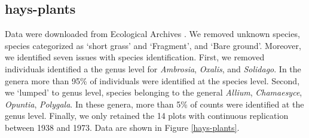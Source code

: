 \documentclass[11pt, oneside]{article}
\begin{document}
\subsection{hays-plants}
Data were downloaded from Ecological Archives \citep{hay_data}.
We removed unknown species, species categorized as `short grass' and `Fragment', and `Bare ground'. 
Moreover, we identified seven issues with species identification. 
First, we removed individuals identified a the genus level for \textit{Ambrosia}, \textit{Oxalis}, and \textit{Solidago}. 
In the genera more than 95\% of individuals were identified at the species level. 
Second, we `lumped' to genus level, species belonging to the general \textit{Allium}, \textit{Chamaesyce}, \textit{Opuntia}, \textit{Polygala}. 
In these genera, more than 5\% of counts were identified at the genus level. 
Finally, we only retained the 14 plots with continuous replication between 1938 and 1973.
Data are shown in Figure \ref{hays-plants}.
\end{document}
